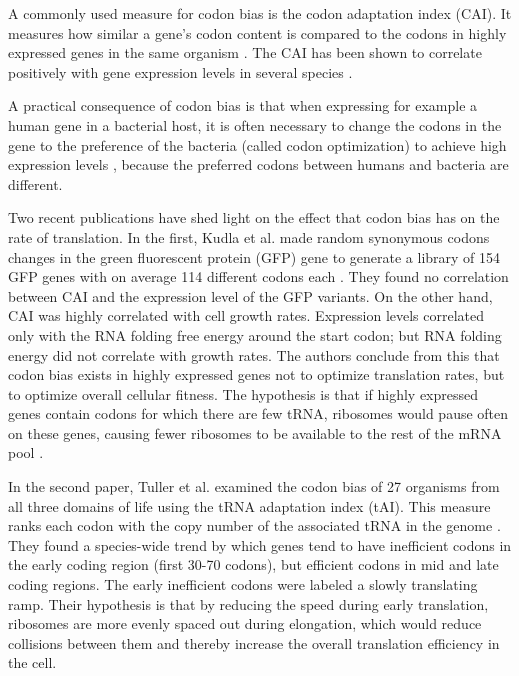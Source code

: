 A commonly used measure for codon bias is the codon adaptation index (CAI). It
measures how similar a gene's codon content is compared to the codons in highly
expressed genes in the same organism \cite{sharp_codon_1987}. The CAI has been
shown to correlate positively with gene expression levels in several species
\cite{duret_expression_1999, jansen_revisiting_2003}.

A practical consequence of codon bias is that when expressing for example a
human gene in a bacterial host, it is often necessary to change the codons in
the gene to the preference of the bacteria (called codon optimization) to
achieve high expression levels \cite{gustafsson_codon_2004}, because the
preferred codons between humans and bacteria are different.

Two recent publications have shed light on the effect that codon bias has on
the rate of translation. In the first, Kudla et al. made random synonymous
codons changes in the green fluorescent protein (GFP) gene to generate a library
of 154 GFP genes with on average 114 different codons each
\cite{kudla_coding-sequence_2009}. They found no correlation between CAI and
the expression level of the GFP variants. On the other hand, CAI was highly
correlated with cell growth rates. Expression levels correlated only with the
RNA folding free energy around the start codon; but RNA folding energy did not
correlate with growth rates. The authors conclude from this that codon bias
exists in highly expressed genes not to optimize translation rates, but to
optimize overall cellular fitness. The hypothesis is that if highly expressed
genes contain codons for which there are few tRNA, ribosomes would pause
often on these genes, causing fewer ribosomes to be available to the rest of
the mRNA pool \cite{kudla_coding-sequence_2009}.

In the second paper, Tuller et al. \cite{tuller_evolutionarily_2010} examined
the codon bias of 27 organisms from all three domains of life using the tRNA
adaptation index (tAI). This measure ranks each codon with the copy number of
the associated tRNA in the genome \cite{tuller_evolutionarily_2010}. They found
a species-wide trend by which genes tend to have inefficient codons in the early
coding region (first 30-70 codons), but efficient codons in mid and late coding
regions. The early inefficient codons were labeled a slowly translating ramp.
Their hypothesis is that by reducing the speed during early translation,
ribosomes are more evenly spaced out during elongation, which would reduce
collisions between them and thereby increase the overall translation efficiency
in the cell.

